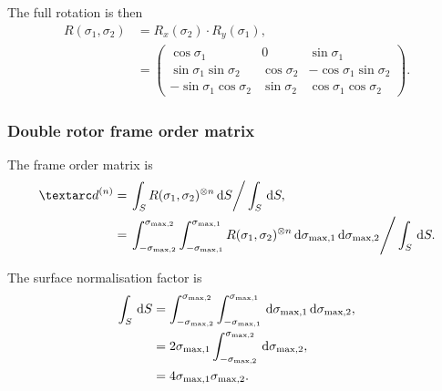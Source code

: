 The full rotation is then
\begin{subequations}
\begin{align}
    R(\sigma_1, \sigma_2) &= R_x(\sigma_2) \cdot R_y(\sigma_1) , \\
    &=
        \begin{pmatrix}
             \cos\sigma_1             & 0            &  \sin\sigma_1 \\
             \sin\sigma_1\sin\sigma_2 & \cos\sigma_2 & -\cos\sigma_1\sin\sigma_2 \\
            -\sin\sigma_1\cos\sigma_2 & \sin\sigma_2 &  \cos\sigma_1\cos\sigma_2
        \end{pmatrix}.
\end{align}
\end{subequations}


\subsubsection{Double rotor frame order matrix}

The frame order matrix is
\begin{align}
    \FOn &= \left. \int_S R(\sigma_1, \sigma_2)^{\otimes n} \diff S \right / \int_S \diff S, \\
         &= \left. \int_{-\conesmaxtwo}^{\conesmaxtwo} \int_{-\conesmaxone}^{\conesmaxone} R(\sigma_1, \sigma_2)^{\otimes n} \diff \conesmaxone \diff \conesmaxtwo
    \right / \int_S \diff S .
\end{align}

The surface normalisation factor is
\begin{subequations}
\begin{align}
    \int_S \,\mathrm{d} S &= \int_{-\sigma_{\textrm{max,2}}}^{\sigma_{\textrm{max,2}}} \int_{-\sigma_{\textrm{max,1}}}^{\sigma_{\textrm{max,1}}} \,\mathrm{d} \sigma_{\textrm{max,1}} \,\mathrm{d} \sigma_{\textrm{max,2}} , \\
                   &= 2 \sigma_{\textrm{max,1}} \int_{-\sigma_{\textrm{max,2}}}^{\sigma_{\textrm{max,2}}} \,\mathrm{d} \sigma_{\textrm{max,2}} , \\
                   &= 4 \sigma_{\textrm{max,1}} \sigma_{\textrm{max,2}} .
\end{align}
\end{subequations}



